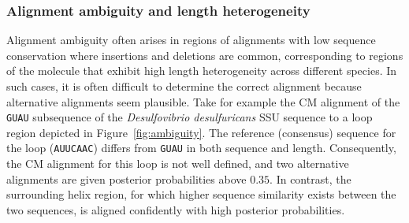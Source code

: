 \subsubsection{Alignment ambiguity and length heterogeneity}

Alignment ambiguity often arises in regions of alignments with low
sequence conservation where insertions and deletions are common,
corresponding to regions of the molecule that exhibit high length
heterogeneity across different species. In such cases, it is often
difficult to determine the correct alignment because alternative
alignments seem plausible. Take for example the CM alignment
of the {\tt GUAU} subsequence of the \emph{Desulfovibrio
desulfuricans} SSU sequence to a loop region depicted in
Figure~\ref{fig:ambiguity}. The reference (consensus) sequence for the
loop ({\tt AUUCAAC}) differs from {\tt GUAU} in both sequence and
length. Consequently, the CM alignment for this loop is not well
defined, and two alternative alignments are given posterior
probabilities above $0.35$.  In contrast, the surrounding helix
region, for which higher sequence similarity exists between the two
sequences, is aligned confidently with high posterior probabilities.

